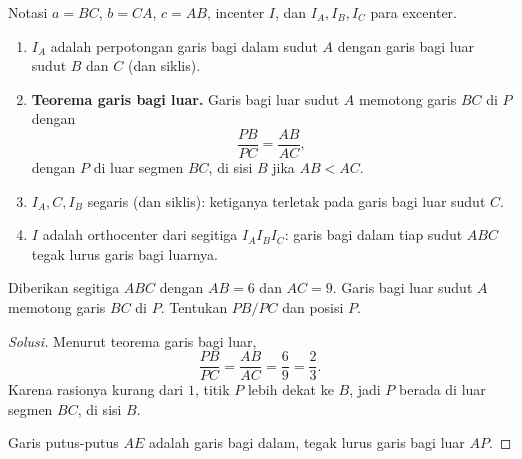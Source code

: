 \documentclass[12pt]{scrartcl}
\begin{document}
\begin{fact}
Notasi $a = BC$, $b = CA$, $c = AB$, incenter $I$,
dan $I_A, I_B, I_C$ para excenter.
\begin{enumerate}
    \item $I_A$ adalah perpotongan garis bagi dalam sudut $A$
    dengan garis bagi luar sudut $B$ dan $C$ (dan siklis).
    \item \textbf{Teorema garis bagi luar.}
    Garis bagi luar sudut $A$ memotong garis $BC$ di $P$ dengan
    \[ \frac{PB}{PC} = \frac{AB}{AC}, \]
    dengan $P$ di luar segmen $BC$, di sisi $B$ jika $AB < AC$.
    \item $I_A, C, I_B$ segaris (dan siklis):
    ketiganya terletak pada garis bagi luar sudut $C$.
    \item $I$ adalah orthocenter dari segitiga $I_AI_BI_C$:
    garis bagi dalam tiap sudut $ABC$ tegak lurus garis bagi luarnya.
\end{enumerate}
\end{fact}

\begin{example}
Diberikan segitiga $ABC$ dengan $AB = 6$ dan $AC = 9$.
Garis bagi luar sudut $A$ memotong garis $BC$ di $P$.
Tentukan $PB/PC$ dan posisi $P$.
\end{example}
\begin{proof}[Solusi]
Menurut teorema garis bagi luar,
\[ \frac{PB}{PC} = \frac{AB}{AC} = \frac{6}{9} = \frac{2}{3}. \]
Karena rasionya kurang dari $1$, titik $P$ lebih dekat ke $B$,
jadi $P$ berada di luar segmen $BC$, di sisi $B$.
\begin{center}
\end{center}
Garis putus-putus $AE$ adalah garis bagi dalam,
tegak lurus garis bagi luar $AP$.
\end{proof}
\end{document}
